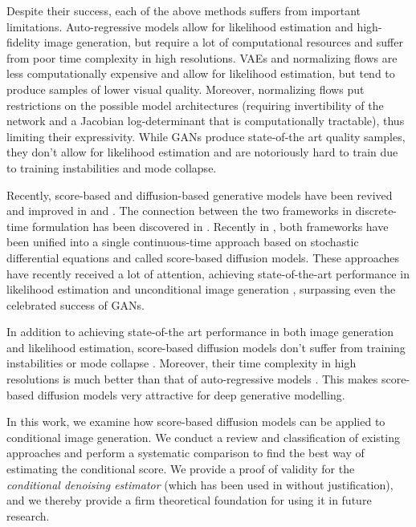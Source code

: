Despite their success, each of the above methods suffers from important limitations. Auto-regressive models allow for likelihood estimation and high-fidelity image generation, but require a lot of computational resources and suffer from poor time complexity in high resolutions. VAEs and normalizing flows are less computationally expensive and allow for likelihood estimation, but tend to produce samples of lower visual quality. Moreover, normalizing flows put restrictions on the possible model architectures (requiring invertibility of the network and a Jacobian log-determinant that is computationally tractable), thus limiting their expressivity. While GANs produce state-of-the art quality samples, they don't allow for likelihood estimation and are notoriously hard to train due to training instabilities and mode collapse. 

Recently, score-based \cite{hyvarinen2005score_original} and diffusion-based  \cite{sohldickstein2015diffusion_original} generative models have been revived and improved in \cite{song2020generative_score} and \cite{ho2020denoising}.  
The connection between the two frameworks in discrete-time formulation has been discovered in \cite{vincent2011connection}. 
Recently in \cite{song2021sde}, both frameworks have been unified into a single continuous-time approach based on stochastic differential equations \cite{song2021sde} and called score-based diffusion models. 
These approaches have recently received a lot of attention, achieving state-of-the-art performance in likelihood estimation \cite{song2021sde} and unconditional image generation \cite{dhariwal2021diffusion_beats_gans}, surpassing even the celebrated success of GANs.

In addition to achieving state-of-the art performance in both image generation and likelihood estimation, score-based diffusion models don't suffer from training instabilities or mode collapse \cite{dhariwal2021diffusion_beats_gans, song2021sde}. Moreover, their time complexity in high resolutions is much better than that of auto-regressive models \cite{dhariwal2021diffusion_beats_gans}. This makes score-based diffusion  models very attractive for deep generative modelling.

In this work, we examine how score-based diffusion  models can be applied to conditional image generation. We conduct a review and classification of existing approaches and perform a systematic comparison to find the best way of estimating the conditional score. We provide a proof of validity for the \textit{conditional denoising estimator} (which has been used in \cite{saharia2021sr3,tashiro2021csdi} without justification), and we thereby provide a firm theoretical foundation for using it in future research.

